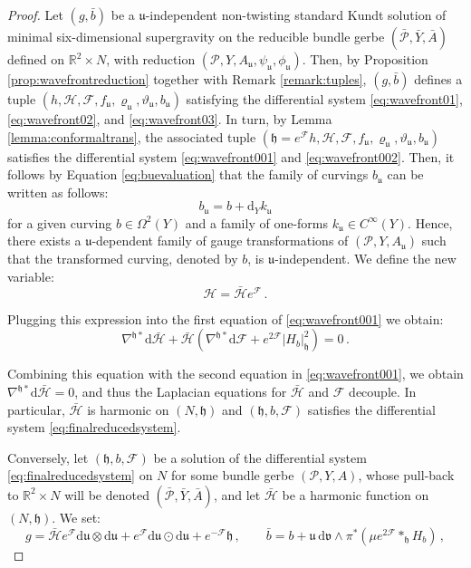 \documentclass[10pt,a4paper,twoside,reqno]{amsart}
\theoremstyle{plain}
\theoremstyle{definition}
\theoremstyle{remark}
\def\dd{\mathrm{d}}
\def\cH{\mathcal{H}}
\def\cP{\mathcal{P}}
\def\cP{\mathcal{P}}
\def\cF{\mathcal{F}}
\def\cH{\mathcal{H}}
\def\dd{\mathrm{d}}
\def\fru{\mathfrak{u}}
\def\frv{\mathfrak{v}}
\begin{document}
\begin{proof}
Let $(g,\bar{b})$ be a $\fru$-independent non-twisting standard Kundt solution of minimal six-dimensional supergravity on the reducible bundle gerbe $(\bar{\cP},\bar{Y},\bar{A})$ defined on $\mathbb{R}^2\times N$, with reduction $(\cP,Y,A_{\fru} , \psi_{\fru} , \phi_{\fru})$. Then, by Proposition \ref{prop:wavefrontreduction} together with Remark \ref{remark:tuples}, $(g,\bar{b})$  defines a tuple $(h,\cH,\cF, f_{\fru} , \varrho_{\fru}, \vartheta_{\fru} , b_{\fru})$ satisfying the differential system \eqref{eq:wavefront01}, \eqref{eq:wavefront02}, and \eqref{eq:wavefront03}. In turn, by Lemma \ref{lemma:conformaltrans}, the associated tuple $(\mathfrak{h} = e^{\cF}h,\cH,\cF, f_{\fru} , \varrho_{\fru}, \vartheta_{\fru} , b_{\fru})$ satisfies the differential system \eqref{eq:wavefront001} and \eqref{eq:wavefront002}.  Then, it follows by Equation \eqref{eq:buevaluation} that the family of curvings $b_{\fru}$ can be written as follows:
\begin{equation*}
b_{\fru} = b + \dd_Y k_{\fru}
\end{equation*}
for a given curving $b\in \Omega^2(Y)$ and a family of one-forms $k_{\fru}\in C^{\infty}(Y)$. Hence, there exists a $\fru$-dependent family of gauge transformations of $(\cP,Y,A_{\fru})$ such that the transformed curving, denoted by $b$, is $\fru$-independent. We define the new variable:
\begin{equation*}
\cH = \bar{\cH} e^{\cF}\, .
\end{equation*}

\noindent
Plugging this expression into the first equation of \eqref{eq:wavefront001} we obtain:
\begin{equation*}
\nabla^{\mathfrak{h}\ast} \dd \bar{\cH} + \bar{\cH}(\nabla^{\mathfrak{h}\ast}\dd \cF  +   e^{2\cF} \vert H_{b} \vert^2_{\mathfrak{h}}) = 0\, .
\end{equation*}

\noindent
Combining this equation with the second equation in \eqref{eq:wavefront001}, we obtain $\nabla^{\mathfrak{h}\ast} \dd \bar{\cH} = 0$, and thus the Laplacian equations for $\bar{\cH}$ and $\cF$ decouple. In particular, $\bar{\cH}$ is harmonic on $(N,\mathfrak{h})$ and $(\mathfrak{h},b, \cF)$ satisfies the differential system \eqref{eq:finalreducedsystem}.\medskip

Conversely, let $(\mathfrak{h},b,\cF)$ be a solution of the differential system \eqref{eq:finalreducedsystem} on $N$ for some bundle gerbe $(\cP,Y,A)$, whose pull-back to $\mathbb{R}^2\times N$ will be denoted $(\bar{\cP}, \bar{Y}, \bar{A})$, and let $\bar{\cH}$ be a harmonic function on $(N,\mathfrak{h})$. We set:
\begin{equation*}
g = \bar{\cH} e^{\cF} \dd\fru \otimes \dd\fru  + e^{\cF} \dd\fru \odot \dd \fru + e^{-\cF} \mathfrak{h}\, , \qquad \bar{b} = b + \fru \, \dd\frv \wedge \pi^{\ast}(\mu e^{2\cF} \ast_{\mathfrak{h}} H_b)\, ,
\end{equation*}


\end{proof}
\end{document}
